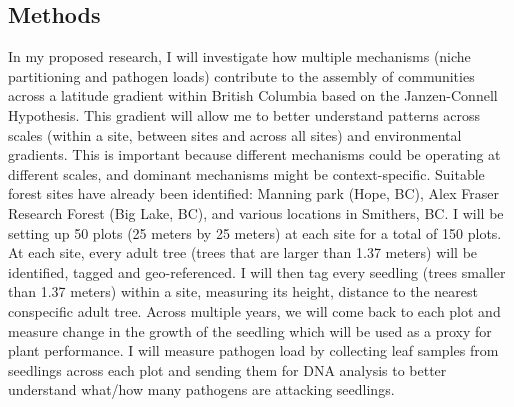 \documentclass{article}
\begin{document}
\subsection{Methods}
In my proposed research, I will investigate how multiple mechanisms (niche partitioning and pathogen loads) contribute to the assembly of communities across a latitude gradient within British Columbia based on the Janzen-Connell Hypothesis. This gradient will allow me to better understand patterns across scales (within a site, between sites and across all sites) and environmental gradients. This is important because different mechanisms could be operating at different scales, and dominant mechanisms might be context-specific. Suitable forest sites have already been identified: Manning park (Hope, BC), Alex Fraser Research Forest (Big Lake, BC), and various locations in Smithers, BC. I will be setting up 50 plots (25 meters by 25 meters) at each site for a total of 150 plots. At each site, every adult tree (trees that are larger than 1.37 meters) will be identified, tagged and geo-referenced. I will then tag every seedling (trees smaller than 1.37 meters) within a site, measuring its height, distance to the nearest conspecific adult tree. Across multiple years, we will come back to each plot and measure change in the growth of the seedling which will be used as a proxy for plant performance. I will measure pathogen load by collecting leaf samples from seedlings across each plot and sending them for DNA analysis to better understand what/how many pathogens are attacking seedlings. 
\end{document}
